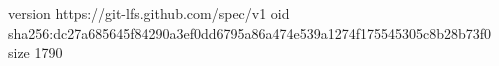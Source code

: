 version https://git-lfs.github.com/spec/v1
oid sha256:dc27a685645f84290a3ef0dd6795a86a474e539a1274f175545305c8b28b73f0
size 1790
